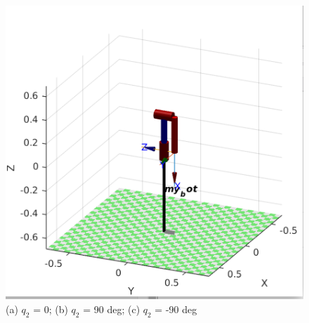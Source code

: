 \documentclass{article}
\begin{document}
\begin{center}
\begin{figure}[!htb]
\begin{minipage}{0.33\textwidth}
   \end{minipage}\hfill
   \begin{minipage}{0.33\textwidth}
     \centering
     \includegraphics[width=\linewidth]{images/frame2_q2_-90.png}
   \end{minipage}
   \caption{(a) $q_2$ = 0; (b) $q_2$ = 90 deg; (c) $q_2$ = -90 deg}
\end{figure} 
\end{center}
\end{document}
